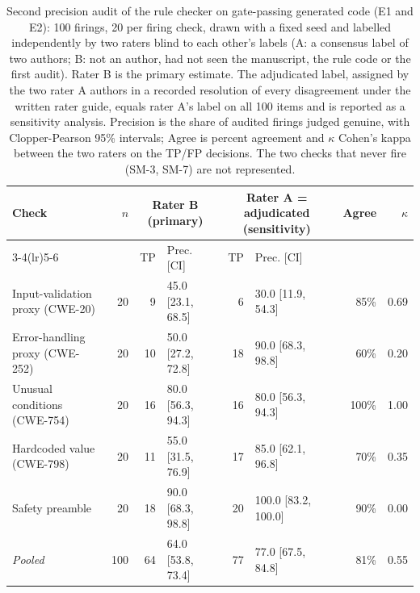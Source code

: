 \begin{table}[t]
\caption{Second precision audit of the rule checker on gate-passing generated code
(E1 and E2): 100 firings, 20 per firing check, drawn with a fixed seed and labelled
independently by two raters blind to each other's labels (A: a consensus label of two
authors; B: not an author, had not seen the manuscript, the rule code or the first
audit). Rater B is the primary estimate. The adjudicated label, assigned by the two
rater A authors in a recorded resolution of every disagreement under the written rater
guide, equals rater A's label on all 100 items and is reported as a sensitivity analysis.
Precision is the share of audited firings judged genuine, with Clopper-Pearson 95\%
intervals; Agree is percent agreement and $\kappa$ Cohen's kappa between the two raters
on the TP/FP decisions. The two checks that never fire (SM-3, SM-7) are not represented.}
\label{tab:precision2}
\centering
\footnotesize
\setlength{\tabcolsep}{3pt}
\begin{tabular}{@{}lrrlrlrr@{}}
\toprule
Check & $n$ & \multicolumn{2}{c}{Rater B (primary)} & \multicolumn{2}{c}{Rater A = adjudicated (sensitivity)} & Agree & $\kappa$ \\
\cmidrule(lr){3-4}\cmidrule(lr){5-6}
 & & TP & Prec. [CI] & TP & Prec. [CI] & & \\
\midrule
Input-validation proxy (CWE-20) & 20 & 9 & 45.0 [23.1, 68.5] & 6 & 30.0 [11.9, 54.3] & 85\% & 0.69 \\
Error-handling proxy (CWE-252) & 20 & 10 & 50.0 [27.2, 72.8] & 18 & 90.0 [68.3, 98.8] & 60\% & 0.20 \\
Unusual conditions (CWE-754) & 20 & 16 & 80.0 [56.3, 94.3] & 16 & 80.0 [56.3, 94.3] & 100\% & 1.00 \\
Hardcoded value (CWE-798) & 20 & 11 & 55.0 [31.5, 76.9] & 17 & 85.0 [62.1, 96.8] & 70\% & 0.35 \\
Safety preamble & 20 & 18 & 90.0 [68.3, 98.8] & 20 & 100.0 [83.2, 100.0] & 90\% & 0.00 \\
\midrule
\textit{Pooled} & 100 & 64 & 64.0 [53.8, 73.4] & 77 & 77.0 [67.5, 84.8] & 81\% & 0.55 \\
\bottomrule
\end{tabular}
\end{table}

